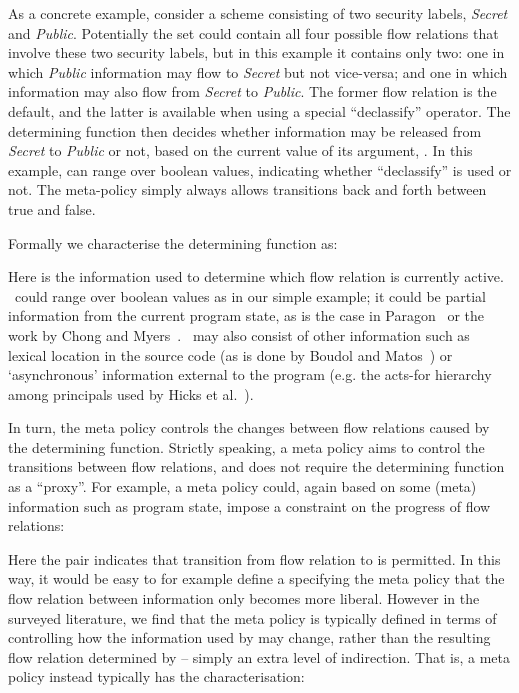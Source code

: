 As a concrete example, consider a scheme consisting of two security labels, \emph{Secret} and \emph{Public}.
Potentially the set \orderings{} could contain all four possible flow relations that involve these 
two security labels, but in this example it contains only two:
one in which \emph{Public} information may flow to \emph{Secret} but not vice-versa; 
and one in which information may also flow from \emph{Secret} to \emph{Public}.
The former flow relation is the default, and the latter is available when using
a special ``declassify'' operator.
The determining function \dynamicpol{} then decides whether information may be released from 
\emph{Secret} to \emph{Public} or not, based on the current value of its argument, . In
this example,  can range over boolean values, indicating whether ``declassify'' is used
or not. The meta-policy simply always allows transitions back and
forth between true and false.





Formally we characterise the determining function as:

Here  is the information used to determine which flow relation is currently active.
~could range over boolean values as in our simple example; it could be partial information from the current program state, as is the case in Paragon~\cite{Paragon} or the work by Chong and Myers~\cite{Chong:Myers:CCS04}.
~may also consist of other information such as lexical location in the source code (as is done by Boudol and Matos~\cite{Boudol:Matos:On}) or `asynchronous' information external to the program (e.g. the acts-for hierarchy among principals used by Hicks et al.~\cite{Hicks+:Dynamic}).

In turn, the meta policy controls the changes between flow relations caused by the determining function.
Strictly speaking, a meta policy aims to control the transitions between flow relations, and does not
require the determining function as a ``proxy''. For example, a meta policy could, again based on some 
(meta) information  such as program state, impose a constraint on the progress of flow relations:

Here the pair  indicates that transition from flow 
relation  to  is permitted. In this way, it would be easy to for example define a \metapol{}
specifying the meta policy that the flow relation between information only becomes more liberal.
However in the surveyed literature, we find that the meta policy is typically defined in terms of
controlling how the information  used by \dynamicpol{} may change, rather than the resulting
flow relation determined by \dynamicpol{} -- simply an extra level of indirection.
That is, a meta policy instead typically has the characterisation:

